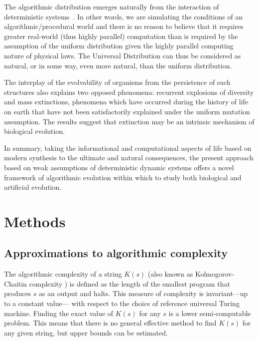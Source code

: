 \documentclass[10pt]{article}
\begin{document}
The algorithmic distribution emerges naturally from the interaction of deterministic systems~\cite{codTeoDist,kirchherr1997miraculous}. In other words, we are simulating the conditions of an algorithmic/procedural world and there is no reason to believe that it requires greater real-world (thus highly parallel) computation than is required by the assumption of the uniform distribution given the highly parallel computing nature of physical laws. The Universal Distribution can thus be considered as natural, or in some way, even more natural, than the uniform distribution.

The interplay of the evolvability of organisms from the persistence of such structures also explains two opposed phenomena: recurrent explosions of diversity and mass extinctions, phenomena which have occurred during the history of life on earth that have not been  satisfactorily explained under the uniform mutation assumption. The results suggest that extinction may be an intrinsic mechanism of biological evolution. 

In summary, taking the informational and computational aspects of life based on modern synthesis to the ultimate and natural consequences, the present approach based on weak assumptions of deterministic dynamic systems offers a novel framework of algorithmic evolution within which to study both biological and artificial evolution.


\section*{Methods}

\subsection*{Approximations to algorithmic complexity}\label{aBDM}

The algorithmic complexity of a string $K(s)$ (also known as Kolmogorov-Chaitin complexity \cite{Kolmogorov,Chaitin74}) is defined as the length of the smallest program that produces $s$ as an output and halts. This measure of complexity is invariant---up to a constant value--- with respect to the choice of reference universal Turing machine. Finding the exact value of $K(s)$ for any $s$ is a lower semi-computable problem. This means that there is no general effective method to find $K(s)$ for any given string, but upper bounds can be estimated.
\end{document}
